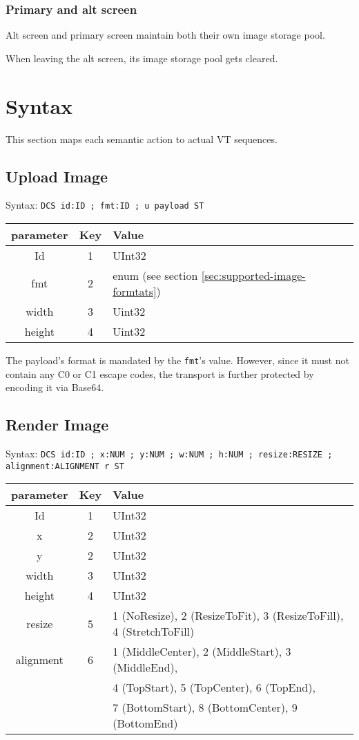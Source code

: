 \documentclass{article}
\newcommand{\code}[1]{\colorbox{light-gray}{\texttt{#1}}}
\begin{document}
\subsubsection*{Primary and alt screen}

Alt screen and primary screen maintain both their own image storage pool.

When leaving the alt screen, its image storage pool gets cleared.
\section{Syntax} %

This section maps each semantic action to actual VT sequences.

\subsection{Upload Image}

Syntax: \code{DCS id:ID ; fmt:ID ; u payload ST}

\begin{tabular}{ |c|c|l| }
    \hline
    parameter   & Key & Value \\
    \hline
    Id          & 1   & UInt32 \\
    fmt         & 2   & enum (see section \ref{sec:supported-image-formtats}) \\
    width       & 3   & Uint32 \\
    height      & 4   & Uint32 \\
    \hline
\end{tabular}

The payload's format is mandated by the \code{fmt}'s value. However, since it must not contain
any C0 or C1 escape codes, the transport is further protected by encoding it via Base64.

\subsection{Render Image}

Syntax: \code{DCS id:ID ; x:NUM ; y:NUM ; w:NUM ; h:NUM ; resize:RESIZE ; alignment:ALIGNMENT r ST}

\begin{tabular}{ |c|c|l| }
    \hline
    parameter   & Key & Value \\
    \hline
    Id          & 1   & UInt32 \\
    x           & 2   & UInt32 \\
    y           & 2   & UInt32 \\
    width       & 3   & UInt32 \\
    height      & 4   & UInt32 \\
    resize      & 5   & 1 (NoResize), 2 (ResizeToFit), 3 (ResizeToFill), 4 (StretchToFill) \\
    alignment   & 6   & 1 (MiddleCenter), 2 (MiddleStart), 3 (MiddleEnd), \\
                &     & 4 (TopStart), 5 (TopCenter), 6 (TopEnd), \\
                &     & 7 (BottomStart), 8 (BottomCenter), 9 (BottomEnd) \\
    \hline
\end{tabular}
\end{document}
